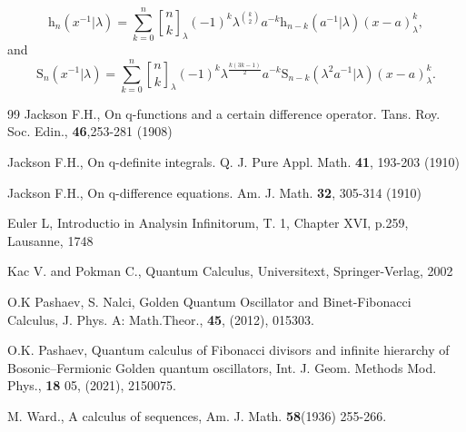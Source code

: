 \documentclass[12pt]{article}
\newcommand{\qbinom}{\genfrac{[}{]}{0pt}{}}
\newcommand{\h}{\mathrm{h}}
\newcommand{\s}{\mathrm{S}}
\begin{document}
\begin{equation}
    \h_{n}(x^{-1}|\lambda)=\sum_{k=0}^{n}\qbinom{n}{k}_{\lambda}(-1)^k\lambda^{\binom{k}{2}}a^{-k}\h_{n-k}(a^{-1}|\lambda)(x-a)_{\lambda}^k,    
\end{equation}
and
\begin{equation}
    \s_{n}(x^{-1}|\lambda)=\sum_{k=0}^{n}\qbinom{n}{k}_{\lambda}(-1)^k\lambda^{\frac{k(3k-1)}{2}}a^{-k}\s_{n-k}(\lambda^2a^{-1}|\lambda)(x-a)_{\lambda}^k.    
\end{equation}
\begin{thebibliography}{99}
{Jackson F.H., }
{On q-functions and a certain difference operator. Tans. Roy. Soc. Edin., \textbf{46},253-281 (1908)}

{Jackson F.H., }
{On q-definite integrals. Q. J. Pure Appl. Math. \textbf{41}, 193-203 (1910)}

{Jackson F.H., }
{On q-difference equations. Am. J. Math. \textbf{32}, 305-314 (1910)}

{Euler L,}
{Introductio in Analysin Infinitorum, T. 1, Chapter XVI, p.259, Lausanne, 1748}

{Kac V. and Pokman C.,}
{Quantum Calculus, Universitext, Springer-Verlag, 2002 }

O.K Pashaev, S. Nalci, 
Golden Quantum Oscillator and Binet-Fibonacci Calculus, 
J. Phys. A: Math.Theor., 
\textbf{45}, 
(2012), 
015303.

O.K. Pashaev, 
Quantum calculus of Fibonacci divisors and infinite hierarchy of Bosonic–Fermionic Golden quantum oscillators, 
Int. J. Geom. Methods Mod. Phys., 
\textbf{18} 05, 
(2021), 
2150075.

{M. Ward.,}
{A calculus of sequences, Am. J. Math. \textbf{58}(1936) 255-266.}

\end{thebibliography}
\end{document}
